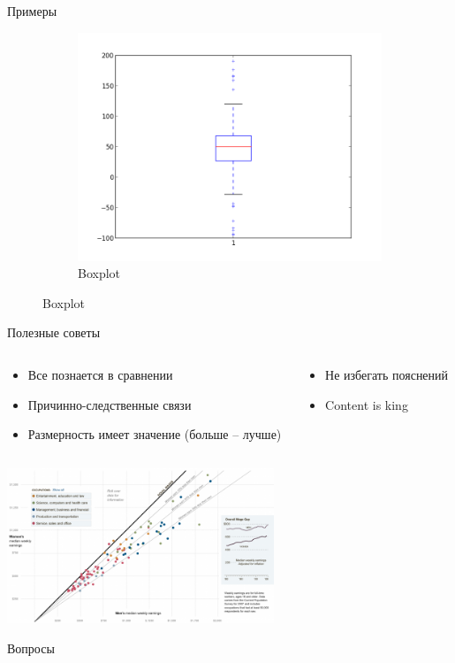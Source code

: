 \documentclass[aspectratio=169]{beamer}
\begin{document}
\begin{frame}{Примеры}
\begin{figure}
\begin{subfigure}[b]{0.3\textwidth}
                \includegraphics[width=\textwidth]{images/box.png}
                \caption{Boxplot}     
        \end{subfigure}
\end{figure}

\end{frame}

\begin{frame}{Полезные советы}

\begin{columns}[T]
    \begin{column}{.5\textwidth}    	
    	\begin{itemize}
		\item Все познается в сравнении
		\item Причинно-следственные связи
		\item Размерность имеет значение (больше -- лучше)
		\end{itemize}	
    \end{column}
    \begin{column}{.5\textwidth}
    \begin{itemize}
		\item Не избегать пояснений
		\item Content is king
		\end{itemize}		
    \end{column}
  \end{columns}
  
  \begin{center}
   		\includegraphics[width=0.6\textwidth]{images/salaries.png}
    \end{center}

\end{frame}

\begin{frame}[plain]
\begin{center}
{\Large Вопросы}
\end{center}
\end{frame}
\end{document}
